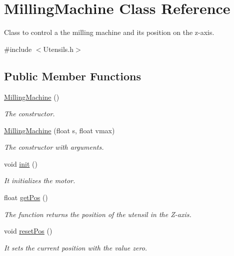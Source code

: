 \hypertarget{class_milling_machine}{\section{Milling\+Machine Class Reference}
\label{class_milling_machine}
}


Class to control a the milling machine and its position on the z-\/axis.  




{\ttfamily \#include $<$Utensils.\+h$>$}

\subsection*{Public Member Functions}
\begin{DoxyCompactItemize}
\item 
\hyperlink{class_milling_machine_adaa67d0774d9fa0ed9d51d7b5cd12a2a}{Milling\+Machine} ()
\begin{DoxyCompactList}\small\item\em The constructor. \end{DoxyCompactList}\item 
\hyperlink{class_milling_machine_ad99b3592af8b895e97e5deb112487fd5}{Milling\+Machine} (float s, float vmax)
\begin{DoxyCompactList}\small\item\em The constructor with arguments. \end{DoxyCompactList}\item 
void \hyperlink{class_milling_machine_ad8b30fc42959606e9773e5ae7e31bac7}{init} ()
\begin{DoxyCompactList}\small\item\em It initializes the motor. \end{DoxyCompactList}\item 
float \hyperlink{class_milling_machine_a5ef6a6c373681cec0b7128d50e9321c3}{get\+Pos} ()
\begin{DoxyCompactList}\small\item\em The function returns the position of the utensil in the Z-\/axis. \end{DoxyCompactList}\item 
void \hyperlink{class_milling_machine_a965590d4d159254dbc9a372ea35c2d63}{reset\+Pos} ()
\begin{DoxyCompactList}\small\item\em It sets the current position with the value zero. \end{DoxyCompactList}\item 

\end{DoxyCompactItemize}
